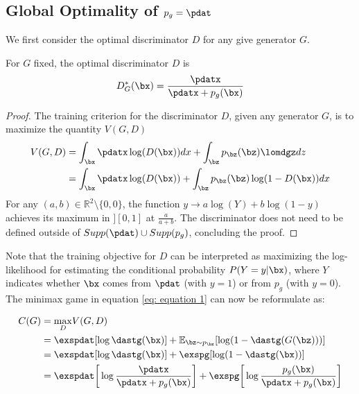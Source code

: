 \subsection{Global Optimality of $p_g = \pdat$}\label{sec: global opt}

We first consider the optimal discriminator $D$ for any give generator $G$.

\begin{proposition}
	For $G$ fixed, the optimal discriminator $D$ is
	\begin{equation}
		D^{\ast}_G(\bx) = \frac{\pdatx}{\pdatx + p_g(\bx)}\label{eq: equation 2}
	\end{equation}
\end{proposition}

\begin{proof}
	The training criterion for the discriminator $D$, given any generator $G$, is to maximize the quantity $V(G, D)$
	\begin{align}
		V(G, D) &= \int_{\bx}{\pdatx}\log(D(\bx))dx + \int_{\bz}{p_{\bz}(\bz)\lomdgz}dz\nonumber\\
		&= \int_{\bx}{\pdatx}\log(D(\bx)) + \int_{\bz}{p_{\bz}(\bz)\log(1 - D(\bx))}dx \label{eq: equation 3}
	\end{align}
	For any $(a, b) \in \mathbb{R}^2 \setminus \{0,0\}$, the function $y\rightarrow a\log(Y)+ b\log(1-y)$ achieves its maximum in $][0,1]$ at $\frac{a}{a+b}$. The discriminator does not need to be defined outside of $Supp(\pdat)\cup Supp(p_g)$, concluding the proof.
\end{proof}

\noindent Note that the training objective for $D$ can be interpreted as maximizing the log-likelihood for estimating the conditional probability $P(Y=y|\bx)$, where $Y$ indicates whether $\bx$ comes from $\pdat$ (with $y=1$) or from $p_g$ (with $y=0$). The minimax game in equation \ref{eq: equation 1}
can now be reformulate as:

\begin{align}
	C(G) &= \underset{D}{\max}V(G,D)\nonumber\\
	&= \exspdat[\log \dastg(\bx)] + \mathbb{E}_{\bz\sim p_{\bz}}[\log(1-\dastg(G(\bz)))]\label{eq: equation 4} \\
	&= \exspdat[\log \dastg(\bx)] + \exspg[\log(1-\dastg(\bx))]\nonumber\\
	&= \exspdat\bigg[\log\frac{\pdatx}{\pdatx+p_g(\bx)}\bigg]+\exspg\bigg[\log\frac{p_g(\bx)}{\pdatx+p_g(\bx)}\bigg]\nonumber
\end{align}

